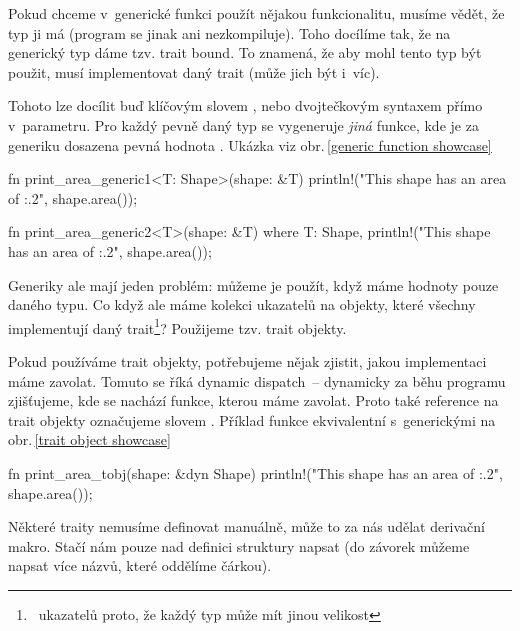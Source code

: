 \documentclass[main.tex]{subfiles}
\begin{document}

Pokud chceme v~generické funkci použít nějakou funkcionalitu, musíme vědět, že typ ji má
(program se jinak ani nezkompiluje). Toho docílíme tak, že na generický typ dáme tzv.
trait bound. To znamená, že aby mohl tento typ být použit, musí implementovat daný trait
(může jich být i~víc). \cite[sekce\,10.2]{thebook}

Tohoto lze docílit buď klíčovým slovem , nebo dvojtečkovým syntaxem přímo
v~parametru. Pro každý pevně daný typ se vygeneruje \emph{jiná} funkce, kde je za generiku
dosazena pevná hodnota \cite[sekce\,10.1]{thebook}.
Ukázka viz obr.\,\ref{generic function showcase}

\obrazek
\begin{rustcode}
    fn print_area_generic1<T: Shape>(shape: &T) {
        println!("This shape has an area of {:.2}", shape.area());
    }

    fn print_area_generic2<T>(shape: &T)
    where
        T: Shape,
    {
        println!("This shape has an area of {:.2}", shape.area());
    }
\end{rustcode}


Generiky ale mají jeden problém: můžeme je použít, když máme hodnoty pouze daného typu.
Co když ale máme kolekci ukazatelů na objekty, které všechny implementují daný
trait\footnote{~ukazatelů proto, že každý typ může mít jinou velikost}? Použijeme tzv.
trait objekty.

Pokud používáme trait objekty, potřebujeme nějak zjistit, jakou implementaci máme zavolat.
Tomuto se říká dynamic dispatch~-- dynamicky za běhu programu zjišťujeme, kde se nachází
funkce, kterou máme zavolat. Proto také reference na trait objekty označujeme slovem
. \cite[sekce\,17.2]{thebook} Příklad funkce ekvivalentní s~generickými na
obr.\,\ref{trait object showcase}

\obrazek
\begin{rustcode}
    fn print_area_tobj(shape: &dyn Shape) {
        println!("This shape has an area of {:.2}", shape.area());
    }
\end{rustcode}


Některé traity nemusíme definovat manuálně, může to za nás udělat derivační makro. Stačí
nám pouze nad definici struktury napsat  (do závorek můžeme
napsat více názvů, které oddělíme čárkou). \cite[sekce\,5.2]{thebook}
\end{document}
